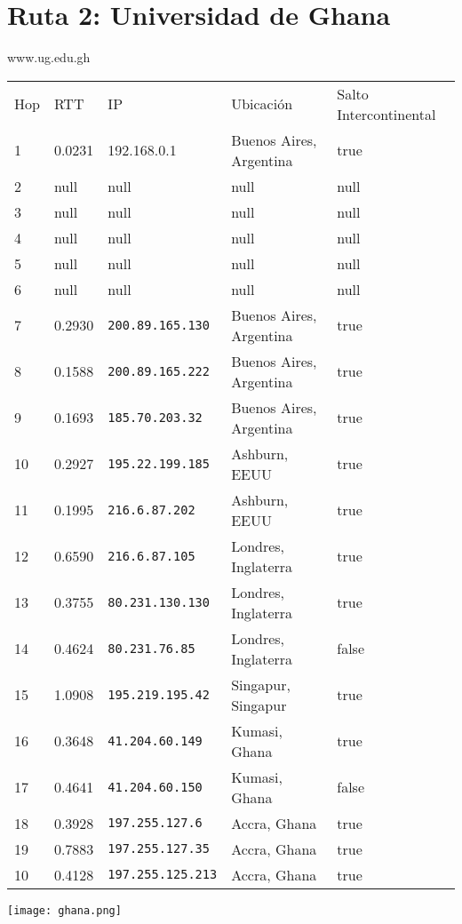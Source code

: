 \section{Ruta 2: Universidad de Ghana}

www.ug.edu.gh

\begin{tabular}{l | l | l | l | l}
Hop & RTT & IP & Ubicación & Salto Intercontinental\\
1 & 0.0231 & 192.168.0.1 & Buenos Aires, Argentina & true\\
2 & null & null & null & null\\
3 & null & null & null & null\\
4 & null & null & null & null\\
5 & null & null & null & null\\
6 & null & null & null & null\\
7 & 0.2930 & \texttt{200.89.165.130} & Buenos Aires, Argentina & true\\
8 & 0.1588 & \texttt{200.89.165.222} & Buenos Aires, Argentina & true\\
9 & 0.1693 & \texttt{185.70.203.32} & Buenos Aires, Argentina & true\\
10 & 0.2927 & \texttt{195.22.199.185} & Ashburn, EEUU & true\\
11 & 0.1995 & \texttt{216.6.87.202} & Ashburn, EEUU & true\\
12 & 0.6590 & \texttt{216.6.87.105} & Londres, Inglaterra & true\\
13 & 0.3755 & \texttt{80.231.130.130} & Londres, Inglaterra & true\\
14 & 0.4624 & \texttt{80.231.76.85} & Londres, Inglaterra & false\\
15 & 1.0908 & \texttt{195.219.195.42} & Singapur, Singapur & true\\
16 & 0.3648 & \texttt{41.204.60.149} & Kumasi, Ghana & true\\
17 & 0.4641 & \texttt{41.204.60.150} & Kumasi, Ghana & false\\
18 & 0.3928 & \texttt{197.255.127.6} & Accra, Ghana & true\\
19 & 0.7883 & \texttt{197.255.127.35} & Accra, Ghana & true\\
10 & 0.4128 & \texttt{197.255.125.213} & Accra, Ghana & true\\
\end{tabular}

\texttt{[image: ghana.png]}